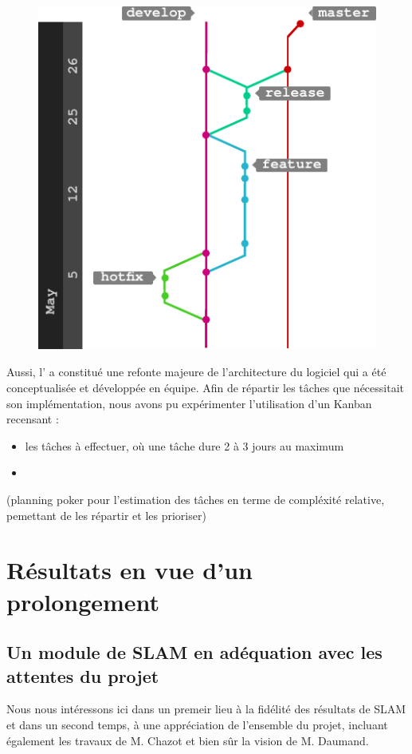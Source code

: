   \begin{figure}
    \centering
      \includegraphics[width=.7\linewidth]{figures/gitflow}  
    \label{fig:gitflow}
  \end{figure}
  
  Aussi, l' a constitué une refonte majeure de l'architecture du logiciel qui a été conceptualisée et développée en équipe. 
  Afin de répartir les tâches que nécessitait son implémentation, nous avons pu expérimenter l'utilisation d'un \gls{Kanban} recensant : 
  \begin{itemize}
   \item les tâches à effectuer, où une tâche dure 2 à 3 jours au maximum 
   \item 
  \end{itemize}

  (planning poker pour l'estimation des tâches en terme de compléxité relative, pemettant de les répartir et les prioriser)
  
\section{Résultats en vue d'un prolongement}  
  \subsection{Un module de SLAM en adéquation avec les attentes du projet}
  
  Nous nous intéressons ici dans un premeir lieu à la fidélité des résultats de SLAM et dans un second temps, à une appréciation de l'ensemble du projet, incluant également les travaux de  M. Chazot et bien sûr la vision de M. Daumand.  
  
